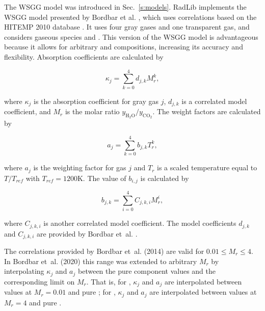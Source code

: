 \documentclass[preprint,12pt]{elsarticle}
\begin{document}
The WSGG model was introduced in Sec.~\ref{s:models}.
RadLib implements the WSGG model presented by Bordbar et al. \citep{Bordbar_2014,Bordbar_2020}, which uses correlations based on the HITEMP 2010 database \cite{Rothman_2010}. It uses four gray gases and one transparent gas, and considers gaseous species  and . This version of the WSGG model is advantageous because it allows for arbitrary  and  compositions, increasing its accuracy and flexibility. Absorption coefficients are calculated by 
%
\begin{linenomath}
\begin{equation}
    \kappa_j=\sum_{k=0}^{4}d_{j,k}M_r^k,
\end{equation}
\end{linenomath}
%
where $\kappa_j$ is the absorption coefficient for gray gas $j$, $d_{j,k}$ is a correlated model coefficient, and $M_r$ is the molar ratio $y_{\mathrm{H_2O}}/y_{\mathrm{CO_2}}$. The weight factors are calculated by 
%
\begin{linenomath}
\begin{equation}
    a_j=\sum_{k=0}^{4}b_{j,k}T_r^k,
\end{equation}
\end{linenomath}
%
where $a_j$ is the weighting factor for gas $j$ and $T_r$ is a scaled temperature equal to $T/T_{ref}$ with $T_{ref}=1200$K. The value of $b_{i,j}$ is calculated by 
%
\begin{linenomath}
\begin{equation}
 b_{j,k}=\sum_{i=0}^{4}C_{j,k,i}M_r^i,
\end{equation}
\end{linenomath}
%
where $C_{j,k,i}$ is another correlated model coefficient. The model coefficients $d_{j,k}$ and $C_{j,k,i}$ are provided by Bordbar et~al. \citep{Bordbar_2014,Bordbar_2020}. 

The correlations provided by Bordbar et~al. (2014) \cite{Bordbar_2014} are valid for $0.01\le M_r\le4$. In Bordbar et~al. (2020) \cite{Bordbar_2020} this range was extended to arbitrary $M_r$ by interpolating $\kappa_j$ and $a_j$ between the pure component values and the corresponding limit on $M_r$. That is, for , $\kappa_j$ and $a_j$ are interpolated between values at $M_r=0.01$ and pure ; for , $\kappa_j$ and $a_j$ are interpolated between values at $M_r=4$ and pure .

\end{document}
